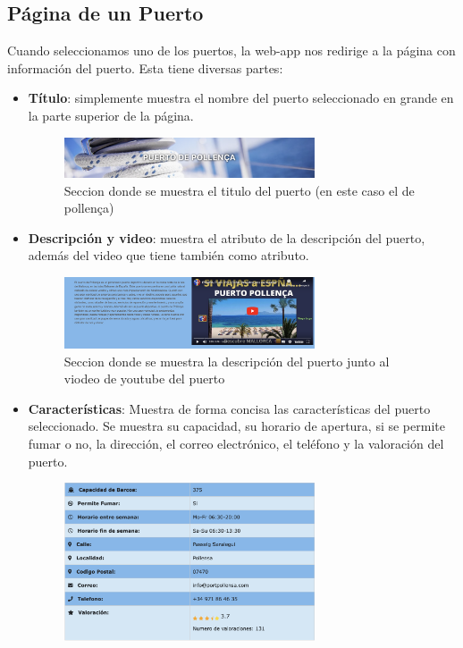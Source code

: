 \documentclass{article}
\begin{document}
\subsection{Página de un Puerto}
Cuando seleccionamos uno de los puertos, la web-app nos redirige a la página con información del puerto. Esta tiene diversas partes:
\begin{itemize}
    \item \textbf{Título}: simplemente muestra el nombre del puerto seleccionado en grande en la parte superior de la página.
    \begin{figure}[ht]
        \centering
        \includegraphics[width=0.7\textwidth]{images/tituloPuerto.png}
        \caption{Seccion donde se muestra el titulo del puerto (en este caso el de pollença)}
    \end{figure}
    \item \textbf{Descripción y video}: muestra el atributo de la descripción del puerto, además del video que tiene también como atributo.
    \begin{figure}[ht]
        \centering
        \includegraphics[width=0.7\textwidth]{images/descVid.png}
        \caption{Seccion donde se muestra la descripción del puerto junto al viodeo de youtube del puerto}
    \end{figure}
    \item \textbf{Características}: Muestra de forma concisa las características del puerto seleccionado. Se muestra su capacidad, su horario de apertura, si se permite fumar o no, la dirección, el correo electrónico, el teléfono y la valoración del puerto.
    \begin{figure}[ht]
        \centering
        \includegraphics[width=0.7\textwidth]{images/caracteristicas.png}

\end{figure}
\end{itemize}
\end{document}

